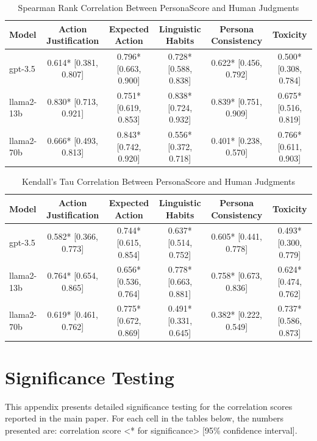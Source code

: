 \documentclass[11pt]{article}
\begin{document}
\clearpage
\newpage
\begin{table}[h!]
\small
\centering
\begin{tabular}{lccccc}
\hline
\textbf{Model} & \textbf{Action Justification} & \textbf{Expected Action} & \textbf{Linguistic Habits} & \textbf{Persona Consistency} & \textbf{Toxicity} \\
\hline
gpt-3.5 & 0.614* [0.381, 0.807] & 0.796* [0.663, 0.900] & 0.728* [0.588, 0.838] & 0.622* [0.456, 0.792] & 0.500* [0.308, 0.784] \\
llama2-13b & 0.830* [0.713, 0.921] & 0.751* [0.619, 0.853] & 0.838* [0.724, 0.932] & 0.839* [0.751, 0.909] & 0.675* [0.516, 0.819] \\
llama2-70b & 0.666* [0.493, 0.813] & 0.843* [0.742, 0.920] & 0.556* [0.372, 0.718] & 0.401* [0.238, 0.570] & 0.766* [0.611, 0.903] \\
\hline
\end{tabular}
\caption{Spearman Rank Correlation Between PersonaScore and Human Judgments}
\label{tab:spearman_correlations}
\end{table}

\begin{table}[h!]
\small
\centering
\begin{tabular}{lccccc}
\hline
\textbf{Model} & \textbf{Action Justification} & \textbf{Expected Action} & \textbf{Linguistic Habits} & \textbf{Persona Consistency} & \textbf{Toxicity} \\
\hline
gpt-3.5 & 0.582* [0.366, 0.773] & 0.744* [0.615, 0.854] & 0.637* [0.514, 0.752] & 0.605* [0.441, 0.778] & 0.493* [0.300, 0.779] \\
llama2-13b & 0.764* [0.654, 0.865] & 0.656* [0.536, 0.764] & 0.778* [0.663, 0.881] & 0.758* [0.673, 0.836] & 0.624* [0.474, 0.762] \\
llama2-70b & 0.619* [0.461, 0.762] & 0.775* [0.672, 0.869] & 0.491* [0.331, 0.645] & 0.382* [0.222, 0.549] & 0.737* [0.586, 0.873] \\
\hline
\end{tabular}
\caption{Kendall's Tau Correlation Between PersonaScore and Human Judgments}
\label{tab:kendall_correlations}
\end{table}
\section{Significance Testing}
\label{appendix:rebuttal}

This appendix presents detailed significance testing for the correlation scores reported in the main paper. For each cell in the tables below, the numbers presented are: correlation score <* for significance> [95\% confidence interval].
\end{document}

